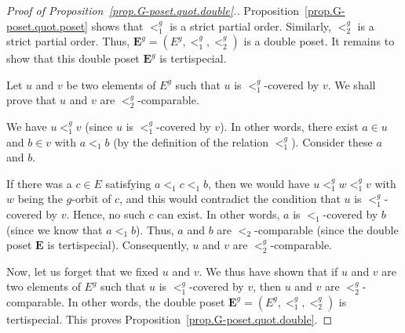 \documentclass[12pt]{article}
\theoremstyle{plain}
\theoremstyle{definition}
\theoremstyle{remark}
\newcommand{\EE}{{\mathbf{E}}}
\begin{document}
\begin{proof}[Proof of Proposition~\ref{prop.G-poset.quot.double}.]

Proposition~\ref{prop.G-poset.quot.poset} shows that $<_{1}^{g}$ is a
strict partial order. Similarly, $<_{2}^{g}$ is a
strict partial order.
Thus, $\EE^g
= \left(E^g, <_1^g, <_2^g\right)$ is a double poset. It remains
to show that this double poset $\EE^g$ is tertispecial.

Let $u$ and $v$ be two elements of
$E^{g}$ such that $u$ is $<_{1}^{g}$-covered by $v$. We shall prove that $u$
and $v$ are $<_{2}^{g}$-comparable.

We have $u<_{1}^{g}v$ (since $u$ is $<_{1}^{g}$-covered by $v$). In other
words, there exist $a\in u$ and $b\in v$ with $a<_{1}b$ (by the
definition of the relation $<_1^{g}$). Consider these $a$ and $b$.


If there was a $c \in E$ satisfying $a <_1 c <_1 b$, then we
would have $u <_1^g w <_1^g v$ with $w$ being the $g$-orbit of
$c$, and this would contradict the condition that $u$ is
$<_1^g$-covered by $v$. Hence, no such $c$ can exist.
In other words, $a$ is $<_1$-covered by $b$ (since we know that
$a <_1 b$). Thus, $a$ and $b$ are $<_2$-comparable (since the
double poset $\EE$ is tertispecial).
Consequently, $u$ and $v$ are $<_2^g$-comparable.


Now, let us forget that we fixed $u$ and $v$. We thus have shown that if
$u$ and $v$ are two elements of $E^{g}$ such that $u$ is $<_{1}^{g}$-covered
by $v$, then $u$ and $v$ are $<_{2}^{g}$-comparable. In other words, the
double poset $\EE^g = \left(E^g, <_1^g, <_2^g\right)$ is tertispecial. This
proves Proposition~\ref{prop.G-poset.quot.double}.
\end{proof}
\end{document}
